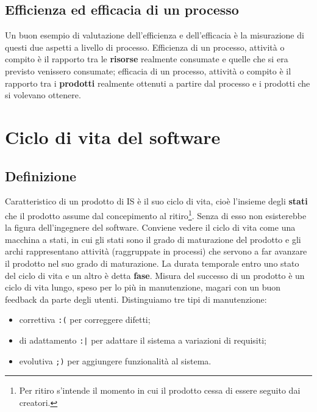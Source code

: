 \documentclass[a4paper]{article}
\begin{document}
		
	\subsection{Efficienza ed efficacia di un processo}

		
Un buon esempio di valutazione dell'efficienza e dell'efficacia è la misurazione di questi due aspetti a livello di processo. Efficienza di un processo, attività o compito è il rapporto tra le \textbf{risorse} realmente consumate e quelle che si era previsto venissero consumate; efficacia di un processo, attività o compito è il rapporto tra i \textbf{prodotti} realmente ottenuti a partire dal processo e i prodotti che si volevano ottenere.
	


		
	\section{Ciclo di vita del software}


		
	\subsection{Definizione}

		
Caratteristico di un prodotto di IS è il suo ciclo di vita, cioè l'insieme degli \textbf{stati} che il prodotto assume dal concepimento al ritiro\footnote{Per ritiro s'intende il momento in cui il prodotto cessa di essere seguito dai creatori.}. Senza di esso non esisterebbe la figura dell'ingegnere del software. Conviene vedere il ciclo di vita come una macchina a stati, in cui gli stati sono il grado di maturazione del prodotto e gli archi rappresentano attività (raggruppate in processi) che servono a far avanzare il prodotto nel suo grado di maturazione. La durata temporale entro uno stato del ciclo di vita e un altro è detta \textbf{fase}. Misura del successo di un prodotto è un ciclo di vita lungo, speso per lo più in manutenzione, magari con un buon feedback da parte degli utenti. Distinguiamo tre tipi di manutenzione:
		
	\begin{itemize}
		
			
	\item correttiva  \texttt{:(}  per correggere difetti;
			
	\item di adattamento  \texttt{:|}  per adattare il sistema a variazioni di requisiti;
			
	\item evolutiva  \texttt{;)}  per aggiungere funzionalità al sistema.
		
	\end{itemize}
\end{document}
